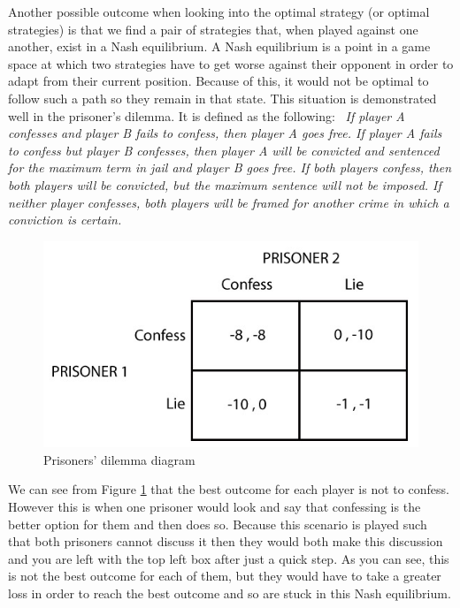 \documentclass[a4paper,titlepage]{article}
\begin{document}
Another possible outcome when looking into the optimal strategy (or optimal strategies) is that we find a pair of strategies that, when played against one another, exist in a Nash equilibrium. A Nash equilibrium\cite{nash} is a point in a game space at which two strategies have to get worse against their opponent in order to adapt from their current position. Because of this, it would not be optimal to follow such a path so they remain in that state. This situation is demonstrated well in the prisoner's dilemma. It is defined as the following: \ \textit{If player A confesses and player B fails to confess, then player A goes free. If player A fails to confess but player B confesses, then player A will be convicted and sentenced for the maximum term in jail and player B goes free. If both players confess, then both players will be convicted, but the maximum sentence will not be imposed. If neither player confesses, both players will be framed for another crime in which a conviction is certain.}
\\
\begin{figure}
\centering
\includegraphics[scale=0.8]{prisoners_dilemma}
\caption{Prisoners' dilemma diagram\label{figure3}}
\end{figure}

We can see from Figure \ref{figure3} that the best outcome for each player is not to confess. However this is when one prisoner would look and say that confessing is the better option for them and then does so. Because this scenario is played such that both prisoners cannot discuss it then they would both make this discussion and you are left with the top left box after just a quick step. As you can see, this is not the best outcome for each of them, but they would have to take a greater loss in order to reach the best outcome and so are stuck in this Nash equilibrium.
\newpage
\end{document}
